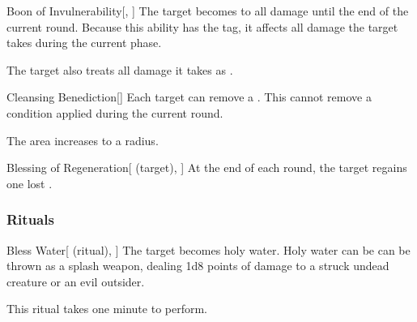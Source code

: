 \lowercase{\hypertarget{spell:Boon of Invulnerability}{}}\label{spell:Boon of Invulnerability}
\begin{freeability}[Rank 6]{\hypertarget{spell:Boon of Invulnerability}{Boon of Invulnerability}}[, ]
The target becomes  to all damage until the end of the current round.
Because this ability has the  tag, it affects all damage the target takes during the current phase.

\rankline
{} The target also treats all damage it takes as .
\end{freeability}
\vspace{0.25em}



\lowercase{\hypertarget{spell:Cleansing Benediction}{}}\label{spell:Cleansing Benediction}
\begin{freeability}[Rank 6]{\hypertarget{spell:Cleansing Benediction}{Cleansing Benediction}}[]
Each target can remove a .
This cannot remove a condition applied during the current round.

\rankline
{} The area increases to a \arealarge radius.
\end{freeability}
\vspace{0.25em}



\lowercase{\hypertarget{spell:Blessing of Regeneration}{}}\label{spell:Blessing of Regeneration}
\begin{attuneability}[Rank 7]{\hypertarget{spell:Blessing of Regeneration}{Blessing of Regeneration}}[ (target), ]
At the end of each round, the target regains one lost .
\end{attuneability}
\vspace{0.25em}



\subsubsection{Rituals}


\lowercase{\hypertarget{spell:Bless Water}{}}\label{spell:Bless Water}
\begin{attuneability}[Rank 1]{\hypertarget{spell:Bless Water}{Bless Water}}[ (ritual), ]
The target becomes holy water.
Holy water can be can be thrown as a splash weapon, dealing 1d8 points of damage to a struck undead creature or an evil outsider.

This ritual takes one minute to perform.
\end{attuneability}
\vspace{0.25em}



